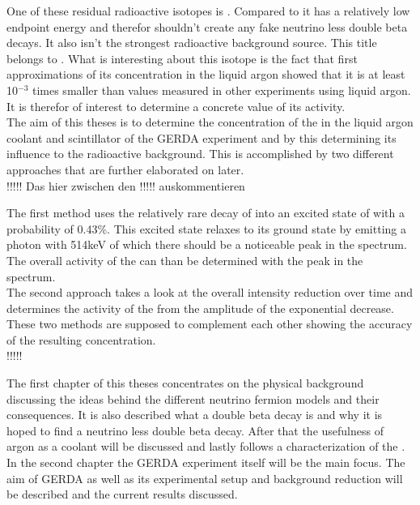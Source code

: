 \documentclass[encoding=utf8,british]{tumphthesis}
\begin{document}
One of these residual radioactive isotopes is \Kr. 
Compared to  it has a relatively low endpoint energy and therefor shouldn't create any fake neutrino less double beta decays. 
It also isn't the strongest radioactive background source. 
This title belongs to . 
What is interesting about this isotope is the fact that first approximations of its concentration in the liquid argon showed that it is at least 10\(^{-3}\) times smaller than values measured in other experiments using liquid argon.
It is therefor of interest to determine a concrete value of its activity. %
\\

The aim of this theses is to determine the concentration of the \Kr in the liquid argon coolant and scintillator of the GERDA experiment and by this determining its influence to the radioactive background. 
This is accomplished by two different approaches that are further elaborated on later. \\

!!!!! Das hier zwischen den !!!!! auskommentieren

The first method uses the relatively rare decay of \Kr into an excited state of  with a probability of 0.43\%. 
This excited state relaxes to its ground state by emitting a photon with 514keV of which there should be a noticeable peak in the spectrum. 
The overall activity of the \Kr can than be determined with the peak in the spectrum. 
\\

The second approach takes a look at the overall intensity reduction over time and determines the activity of the \Kr from the amplitude of the exponential decrease. 
These two methods are supposed to complement each other showing the accuracy of the resulting concentration.\\

!!!!!

The first chapter of this theses concentrates on the physical background discussing the ideas behind the different neutrino fermion models and their consequences. 
It is also described what a double beta decay is and why it is hoped to find a neutrino less double beta decay. 
After that the usefulness of argon as a coolant will be discussed and lastly follows a characterization of the \Kr.\\

In the second chapter the GERDA experiment itself will be the main focus. 
The aim of GERDA as well as its experimental setup and background reduction will be described and the current results discussed.\\
\end{document}
